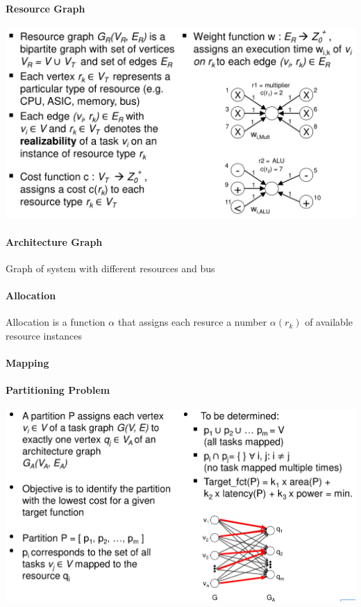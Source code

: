 \documentclass[english]{latex4ei/latex4ei_sheet}
\begin{document}
\paragraph{Resource Graph}

\begin{center}
  \includegraphics[width=\linewidth]{assets/ResourceGraph.png}
  \label{fig:resourcegraph}
\end{center}

\paragraph{Architecture Graph} Graph of system with different resources and bus

\paragraph{Allocation} Allocation is a function $\alpha$ that assigns each resurce a number $\alpha(r_k)$ of available resource instances 

\paragraph{Mapping}

\paragraph{Partitioning Problem}

\begin{center}
  \centering
  \includegraphics[width=\linewidth]{assets/PartitioningProblem.png}
  \label{fig:partitioningproblem}
\end{center}
\end{document}
